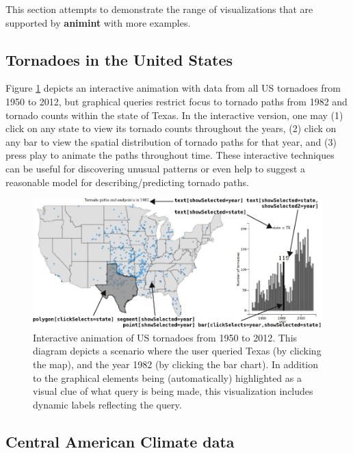 \documentclass[12pt,]{article}
\theoremstyle{definition}
\theoremstyle{definition}
\theoremstyle{definition}
\theoremstyle{remark}
\begin{document}
This section attempts to demonstrate the range of visualizations that
are supported by \textbf{animint} with more examples.

\hypertarget{tornadoes-in-the-united-states}{%
\subsection{Tornadoes in the United
States}\label{tornadoes-in-the-united-states}}

Figure \ref{fig:tornado} depicts an interactive animation with data from
all US tornadoes from 1950 to 2012, but graphical queries restrict focus
to tornado paths from 1982 and tornado counts within the state of Texas.
In the interactive version, one may (1) click on any state to view its
tornado counts throughout the years, (2) click on any bar to view the
spatial distribution of tornado paths for that year, and (3) press play
to animate the paths throughout time. These interactive techniques can
be useful for discovering unusual patterns or even help to suggest a
reasonable model for describing/predicting tornado paths.

\begin{figure}
\centering
\includegraphics{images/figure-tornado}
\caption{\label{fig:tornado}Interactive animation of US tornadoes from 1950
to 2012. This diagram depicts a scenario where the user queried Texas
(by clicking the map), and the year 1982 (by clicking the bar chart). In
addition to the graphical elements being (automatically) highlighted as
a visual clue of what query is being made, this visualization includes
dynamic labels reflecting the query.}
\end{figure}

\hypertarget{central-american-climate-data}{%
\subsection{Central American Climate
data}\label{central-american-climate-data}}
\end{document}
